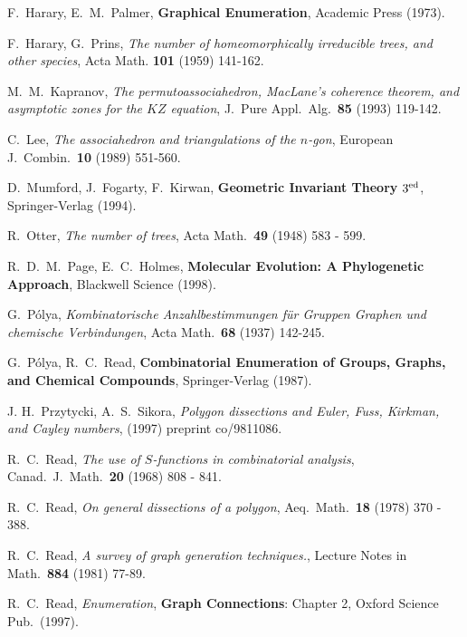 \documentclass[10pt]{amsart}
\begin{document}
\begin{thebibliography}{ADM9}
     F.\ Harary, E.\ M.\ Palmer, {\bf Graphical Enumeration}, Academic Press (1973).
    
     F.\ Harary, G.\ Prins, {\em The number of homeomorphically irreducible trees, and other species}, Acta Math. {\bf 101} (1959) 141-162.
    
     M.\ M.\ Kapranov, {\em The permutoassociahedron, MacLane's coherence theorem, and asymptotic zones for the $KZ$ equation}, J.\ Pure Appl.\ Alg.\ {\bf 85} (1993) 119-142.
    
     C.\ Lee, {\em The associahedron and triangulations of the $n$-gon}, European J.\ Combin.\ {\bf 10} (1989) 551-560.
    
     D.\ Mumford, J.\ Fogarty, F.\ Kirwan, {\bf Geometric Invariant Theory} $3^{\rm ed}$, Springer-Verlag (1994).
    
     R.\ Otter, {\em The number of trees}, Acta Math.\ {\bf 49} (1948) 583 - 599.
    
     R.\ D.\ M.\ Page, E.\ C.\ Holmes, {\bf Molecular Evolution: A Phylogenetic Approach}, Blackwell Science (1998).
    
     G.\ P\'{o}lya, {\em Kombinatorische Anzahlbestimmungen f\"{u}r Gruppen Graphen und chemische Verbindungen}, Acta Math.\ {\bf 68} (1937) 142-245.
    
     G.\ P\'{o}lya, R.\ C.\ Read, {\bf Combinatorial Enumeration of Groups, Graphs, and Chemical Compounds}, Springer-Verlag (1987).
    
     J. H.\ Przytycki, A.\ S.\ Sikora, {\em Polygon dissections and Euler, Fuss, Kirkman, and Cayley numbers}, (1997) preprint co/9811086.
    
     R.\ C.\ Read, {\em The use of $S$-functions in combinatorial analysis}, Canad.\ J.\ Math.\ {\bf 20} (1968) 808 - 841.
    
     R.\ C.\ Read, {\em On general dissections of a polygon}, Aeq.\ Math.\ {\bf 18} (1978) 370 - 388.
    
     R.\ C.\ Read, {\em A survey of graph generation techniques.}, Lecture Notes in Math.\ {\bf 884} (1981) 77-89.

     R.\ C.\ Read, {\em Enumeration}, \textbf{Graph Connections}: Chapter 2, Oxford Science Pub.\ (1997).
    

    

    

    

    
    \end{thebibliography}
\end{document}
